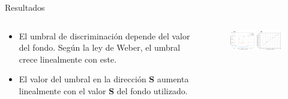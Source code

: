 \documentclass[
    11pt, %
    aspectratio=169, %
]{beamer}
\begin{document}
\begin{frame}{Resultados}
  \begin{columns}[c] %

    
		\begin{column}{0.40\textwidth}

    \begin{itemize}
        \item El umbral de discriminación depende del valor del fondo. Según la ley de Weber, el umbral crece linealmente con este. 
        \item El valor del umbral en la dirección \textbf{S} aumenta linealmente con el valor \textbf{S} del fondo utilizado.
      
    \end{itemize}

                
		\end{column}
  		\begin{column}{0.60\textwidth} %
                 \begin{figure}[h!]
                    \centering
                    \includegraphics[angle=0, width=8.5cm]{Images/resultados/ley_weber_s.pdf}
                \end{figure}
		\end{column}		
	\end{columns}
    
\end{frame}
\end{document}
